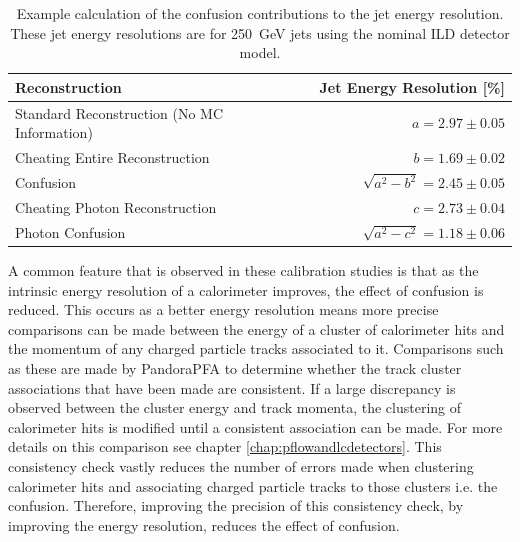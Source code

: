 \begin{table}[h!]
\centering
\begin{tabular}{ l r}
\hline
Reconstruction & Jet Energy Resolution [\%] \\
\hline
Standard Reconstruction (No MC Information) & $a = 2.97\pm0.05$ \\
Cheating Entire Reconstruction & $b = 1.69\pm0.02$ \\
Confusion & $\sqrt{a^{2}-b^{2}} = 2.45\pm0.05$ \\
\hline
Cheating Photon Reconstruction & $c = 2.73\pm0.04$ \\
Photon Confusion & $\sqrt{a^{2}-c^{2}} =1.18\pm0.06$ \\
\hline
\end{tabular}
\caption[Example calculation of the confusion contributions to the jet energy resolution.  These jet energy resolutions are for 250~GeV jets using the nominal ILD detector model.]{Example calculation of the confusion contributions to the jet energy resolution.  These jet energy resolutions are for 250~GeV jets using the nominal ILD detector model.}
\label{table:confusioncalculation}
\end{table}

A common feature that is observed in these calibration studies is that as the intrinsic energy resolution of a calorimeter improves, the effect of confusion is reduced.  This occurs as a better energy resolution means more precise comparisons can be made between the energy of a cluster of calorimeter hits and the momentum of any charged particle tracks associated to it.  Comparisons such as these are made by PandoraPFA to determine whether the track cluster associations that have been made are consistent.  If a large discrepancy is observed between the cluster energy and track momenta, the clustering of calorimeter hits is modified until a consistent association can be made.  For more details on this comparison see chapter \ref{chap:pflowandlcdetectors}.  This consistency check vastly reduces the number of errors made when clustering calorimeter hits and associating charged particle tracks to those clusters i.e. the confusion.  Therefore, improving the precision of this consistency check, by improving the energy resolution, reduces the effect of confusion.  


